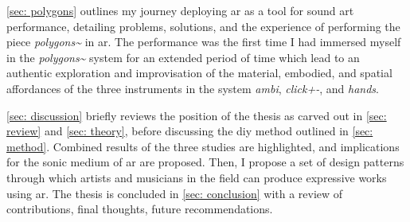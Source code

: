 \autoref{sec: polygons} outlines my journey deploying \gls{ar} as a tool for sound \gls{art} performance, detailing problems, solutions, and the experience of performing the piece \textit{polygons\textasciitilde{}} in \gls{ar}. The performance was the first time I had immersed myself in the \textit{polygons\textasciitilde{}} system for an extended period of time which lead to an authentic exploration and improvisation of the material, embodied, and spatial affordances of the three instruments in the system \textit{ambi}, \textit{click+-}, and \textit{hands}.

\autoref{sec: discussion} briefly reviews the position of the thesis as carved out in \autoref{sec: review} and \autoref{sec: theory}, before discussing the \gls{diy} method outlined in \autoref{sec: method}. Combined results of the three studies are highlighted, and implications for the sonic medium of \gls{ar} are proposed. Then, I propose a set of design patterns through which artists and musicians in the field can produce expressive works using \gls{ar}. The thesis is concluded in \autoref{sec: conclusion} with a review of contributions, final thoughts, future recommendations.

